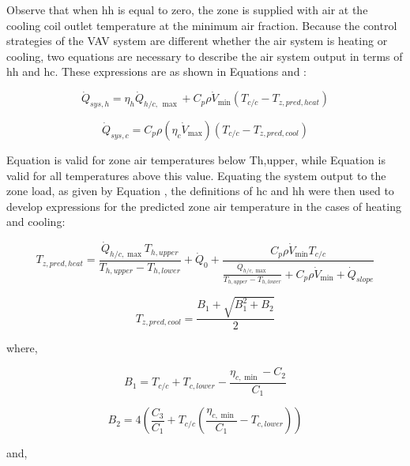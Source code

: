 Observe that when hh is equal to zero, the zone is supplied with air at the cooling coil outlet temperature at the minimum air fraction. Because the control strategies of the VAV system are different whether the air system is heating or cooling, two equations are necessary to describe the air system output in terms of hh and hc. These expressions are as shown in Equations and :

\begin{equation}
{\dot Q_{sys,h}} = {\eta_h}{\dot Q_{h/c,\,\max }} + {C_p}\rho {\dot V_{\min }}\left( {{T_{c/c}} - {T_{z,pred,heat}}} \right)
\end{equation}

\begin{equation}
{\dot Q_{sys,c}} = {C_p}\rho \left( {{\eta_c}{{\dot V}_{\max }}} \right)\left( {{T_{c/c}} - {T_{z,pred,cool}}} \right)
\end{equation}

Equation is valid for zone air temperatures below Th,upper, while Equation is valid for all temperatures above this value. Equating the system output to the zone load, as given by Equation , the definitions of hc and hh were then used to develop expressions for the predicted zone air temperature in the cases of heating and cooling:

\begin{equation}
{T_{z,pred,heat}} = \frac{{{{\dot Q}_{h/c,\max }}{T_{h,upper}}}}{{{T_{h,upper}} - {T_{h,lower}}}} + {\dot Q_0} + \frac{{{C_p}\rho {{\dot V}_{\min }}{T_{c/c}}}}{{\frac{{{{\dot Q}_{h/c,\max }}}}{{{T_{h,upper}} - {T_{h,lower}}}} + {C_p}\rho {{\dot V}_{\min }} + {{\dot Q}_{slope}}}}
\end{equation}

\begin{equation}
{T_{z,pred,cool}} = \frac{{{B_1} + \sqrt {B_1^2 + {B_2}} }}{2}
\end{equation}

where,

\begin{equation}
{B_1} = {T_{c/c}} + {T_{c,lower}} - \frac{{{\eta_{c,\min }} - {C_2}}}{{{C_1}}}
\end{equation}

\begin{equation}
{B_2} = 4\left( {\frac{{{C_3}}}{{{C_1}}} + {T_{c/c}}\left( {\frac{{{\eta_{c,\min }}}}{{{C_1}}} - {T_{c,lower}}} \right)} \right)
\end{equation}

and,

